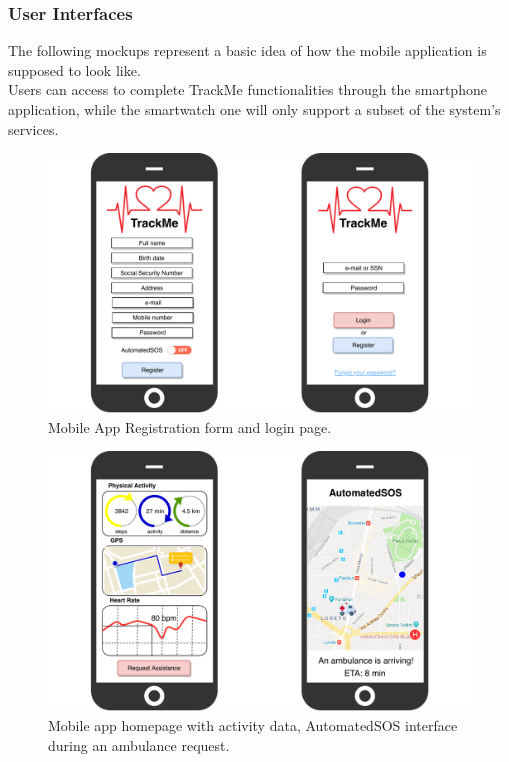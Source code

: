 \documentclass[12pt,a4paper]{article}
\begin{document}
			\subsubsection{User Interfaces}
				The following mockups represent a basic idea of how the mobile application is supposed to look like.\\ Users can access to complete TrackMe functionalities through the smartphone application, while the smartwatch one will only support a subset of the system's services.
				\begin{figure}[h]
					\centering
					\includegraphics[width=1.0\linewidth]{Images/login-registration}
					\caption{Mobile App Registration form and login page.}
					\label{fig:login-registration}
			   \end{figure}
		      \begin{figure}[H]
					\centering
					\includegraphics[width=1.0\linewidth]{Images/pages}
					\caption{Mobile app homepage with activity data, AutomatedSOS interface during an ambulance request.}
			    \end{figure}
\end{document}
